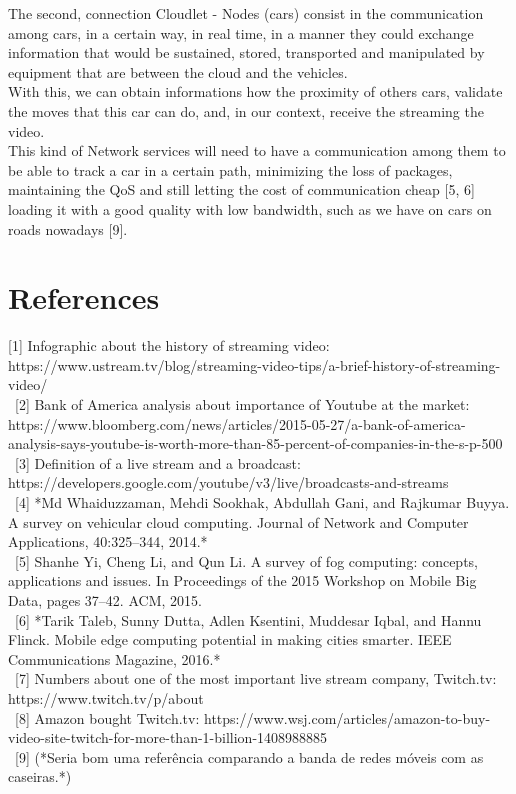 \documentclass[a4paper]{article}
\begin{document}
The second, connection Cloudlet - Nodes (cars) consist in the communication among cars, in a certain way, in real time, in a manner they could exchange information that would be sustained, stored, transported and manipulated by equipment that are between the cloud and the vehicles.\\ 
With this, we can obtain informations how the proximity of others cars, validate the moves that this car can do, and, in our context, receive the streaming the video. \\
This kind of Network services will need to have a communication among them to be able to track a car in a certain path, minimizing the loss of packages, maintaining the QoS and still letting the cost of communication cheap [5, 6] loading it with a good quality with low bandwidth, such as we have on cars on roads nowadays [9].

\section{References}
[1] Infographic about the history of streaming video: https://www.ustream.tv/blog/streaming-video-tips/a-brief-history-of-streaming-video/
\\ \ [2] Bank of America analysis about importance of Youtube at the market: \\ https://www.bloomberg.com/news/articles/2015-05-27/a-bank-of-america-analysis-says-youtube-is-worth-more-than-85-percent-of-companies-in-the-s-p-500
\\ \ [3] Definition of a live stream and a broadcast: \\ 
https://developers.google.com/youtube/v3/live/broadcasts-and-streams
\\ \ [4] *Md Whaiduzzaman, Mehdi Sookhak, Abdullah Gani, and Rajkumar Buyya. A
survey on vehicular cloud computing. Journal of Network and Computer
Applications, 40:325–344, 2014.*
\\ \ [5] Shanhe Yi, Cheng Li, and Qun Li. A survey of fog computing: concepts,
applications and issues. In Proceedings of the 2015 Workshop on Mobile Big
Data, pages 37–42. ACM, 2015.
\\ \ [6]  *Tarik Taleb, Sunny Dutta, Adlen Ksentini, Muddesar Iqbal, and Hannu Flinck.
Mobile edge computing potential in making cities smarter. IEEE Communications
Magazine, 2016.*
\\ \ [7] Numbers about one of the most important live stream company, Twitch.tv: \\ https://www.twitch.tv/p/about
\\ \ [8] Amazon bought Twitch.tv: https://www.wsj.com/articles/amazon-to-buy-video-site-twitch-for-more-than-1-billion-1408988885
\\ \ [9] (*Seria bom uma referência comparando a banda de redes móveis com as caseiras.*)
\end{document}
